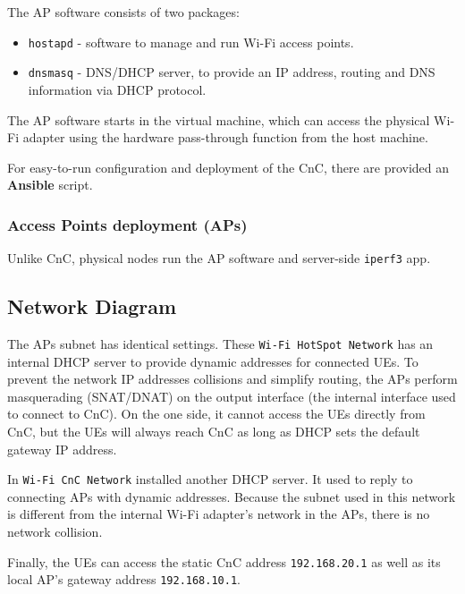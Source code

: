The AP software consists of two packages:

\begin{itemize}
\tightlist
\item
  \texttt{hostapd} - software to manage and run Wi-Fi access points.
\item
  \texttt{dnsmasq} - DNS/DHCP server, to provide an IP address, routing
  and DNS information via DHCP protocol.
\end{itemize}

The AP software starts in the virtual machine, which can access the physical Wi-Fi adapter using the hardware pass-through function from the host machine.

For easy-to-run configuration and deployment of the CnC, there are
provided an \textbf{Ansible} script.

\subsubsection{Access Points deployment
(APs)}\label{access-points-deployment-aps}

Unlike CnC, physical nodes run the AP software and server-side
\texttt{iperf3} app.

\subsection{Network Diagram}\label{network-diagram}

The APs subnet has identical settings. These
\texttt{Wi-Fi\ HotSpot\ Network} has an internal DHCP server to provide
dynamic addresses for connected UEs. To prevent the network IP addresses
collisions and simplify routing, the APs perform masquerading
(SNAT/DNAT) on the output interface (the internal interface used to
connect to CnC). On the one side, it cannot access the UEs directly from
CnC, but the UEs will always reach CnC as long as DHCP sets the default
gateway IP address.

In \texttt{Wi-Fi\ CnC\ Network} installed another DHCP server. It used
to reply to connecting APs with dynamic addresses. Because the subnet
used in this network is different from the internal Wi-Fi adapter's
network in the APs, there is no network collision.

Finally, the UEs can access the static CnC address \texttt{192.168.20.1}
as well as its local AP's gateway address \texttt{192.168.10.1}.


